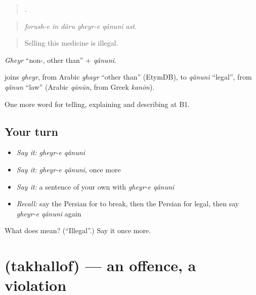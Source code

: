 \begin{quote}
    .
\end{quote}

\begin{quote}
\emph{forush-e in dâru gheyr-e qânuni ast.}
\end{quote}

\begin{quote}
Selling this medicine is illegal.
\end{quote}

\emph{Gheyr} \textquotedblleft{}non-, other than\textquotedblright{} + \emph{qânuni}.

\begin{cousinweb}
\textbf{} joins \emph{gheyr}, from Arabic \emph{ghayr} \textquotedblleft{}other than\textquotedblright{} (EtymDB), to \emph{qânuni} \textquotedblleft{}legal\textquotedblright{}, from \emph{qânun} \textquotedblleft{}law\textquotedblright{} (Arabic \emph{qānūn}, from Greek \emph{kanōn}).
\end{cousinweb}

\begin{grammarlens}[title={What you've built}]
One more word for telling, explaining and describing at B1.
\end{grammarlens}

\subsection*{Your turn}
\begin{itemize}
\raggedright
  \item \emph{Say it:} \emph{gheyr-e qânuni}
  \item \emph{Say it:} \emph{gheyr-e qânuni}, once more
  \item \emph{Say it:} a sentence of your own with \emph{gheyr-e qânuni}
  \item \emph{Recall:} say the Persian for to break, then the Persian for legal, then say \emph{gheyr-e qânuni} again
\end{itemize}

\begin{tcolorbox}[breakable,colback=teal!4,colframe=teal!35!black,title={Before you move on}]
What does  mean? (\textquotedblleft{}Illegal\textquotedblright{}.) Say it once more.
\end{tcolorbox}
\section[\texorpdfstring{\fa{تخلف} (takhallof)}{تخلف (takhallof)}]{ (takhallof) — an offence, a violation}

